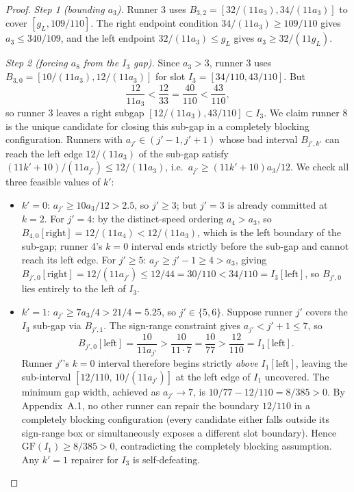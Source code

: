 \documentclass[12pt]{article}
\begin{document}
\begin{proof}
\emph{Step 1 (bounding $a_3$).} Runner 3 uses $B_{3,2}=[32/(11a_3),34/(11a_3)]$
to cover $[g_L,109/110]$. The right endpoint condition $34/(11a_3)\ge 109/110$
gives $a_3\le 340/109$, and the left endpoint $32/(11a_3)\le g_L$
gives $a_3\ge 32/(11g_L)$.

\emph{Step 2 (forcing $a_8$ from the $I_3$ gap).} Since $a_3>3$, runner 3 uses
$B_{3,0}=[10/(11a_3),12/(11a_3)]$ for slot $I_3=[34/110,43/110]$. But
\[
\frac{12}{11a_3} < \frac{12}{33} = \frac{40}{110} < \frac{43}{110},
\]
so runner 3 leaves a right subgap $[12/(11a_3),43/110]\subset I_3$. We claim runner 8 is
the unique candidate for closing this sub-gap in a completely blocking configuration.
Runners with $a_{j'}\in(j'-1,j'+1)$ whose bad interval $B_{j',k'}$ can reach the left
edge $12/(11a_3)$ of the sub-gap satisfy $(11k'+10)/(11a_{j'})\le 12/(11a_3)$, i.e.\
$a_{j'}\ge (11k'+10)a_3/12$. We check all three feasible values of $k'$:

\begin{itemize}
\item $k'=0$: $a_{j'}\ge 10a_3/12>2.5$, so $j'\ge 3$; but $j'=3$ is already committed
at $k=2$. For $j'=4$: by the distinct-speed ordering $a_4>a_3$, so
$B_{4,0}[\text{right}]=12/(11a_4)<12/(11a_3)$, which is the left boundary of the
sub-gap; runner 4's $k=0$ interval ends strictly before the sub-gap and cannot reach
its left edge. For $j'\ge 5$: $a_{j'}\ge j'-1\ge 4>a_3$, giving
$B_{j',0}[\text{right}]=12/(11a_{j'})\le 12/44=30/110<34/110=I_3[\text{left}]$,
so $B_{j',0}$ lies entirely to the left of $I_3$.

\item $k'=1$: $a_{j'}\ge 7a_3/4>21/4=5.25$, so $j'\in\{5,6\}$. Suppose runner
$j'$ covers the $I_3$ sub-gap via $B_{j',1}$. The sign-range constraint gives
$a_{j'}<j'+1\le 7$, so
\[
B_{j',0}[\text{left}] = \frac{10}{11a_{j'}} > \frac{10}{11\cdot 7} = \frac{10}{77}
  > \frac{12}{110} = I_1[\text{left}].
\]
Runner $j'$'s $k=0$ interval therefore begins strictly \emph{above} $I_1[\text{left}]$,
leaving the sub-interval $[12/110,\,10/(11a_{j'})]$ at the left edge of $I_1$ uncovered.
The minimum gap width, achieved as $a_{j'}\to 7$, is $10/77-12/110=8/385>0$.
By Appendix~A.1, no other runner can repair the boundary $12/110$ in a completely
blocking configuration (every candidate either falls outside its sign-range box or
simultaneously exposes a different slot boundary). Hence $\mathrm{GF}(I_1)\ge 8/385>0$,
contradicting the completely blocking assumption. Any $k'=1$ repairer for $I_3$ is
self-defeating.


\end{itemize}
\end{proof}
\end{document}
